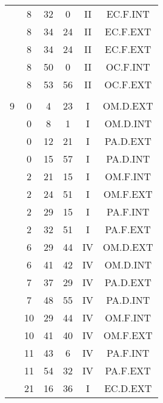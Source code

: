 \documentclass[12pt, a4paper]{article}
\begin{document}
\begin{multicols}{3}
{\begin{tabular}{c c c c c c}
	 	 	 	 & 8 & 32 & 0 & II & EC.F.INT\\%
	 	 	 	 & 8 & 34 & 24 & II & EC.F.EXT\\%
	 	 	 	 & 8 & 34 & 24 & II & EC.F.EXT\\%
	 	 	 	 & 8 & 50 & 0 & II & OC.F.INT\\%
	 	 	 	 & 8 & 53 & 56 & II & OC.F.EXT\\%
	 	 	 	 & & & & & \\%
	 	 	 	9 & 0 & 4 & 23 & I & OM.D.EXT\\%
	 	 	 	 & 0 & 8 & 1 & I & OM.D.INT\\%
	 	 	 	 & 0 & 12 & 21 & I & PA.D.EXT\\%
	 	 	 	 & 0 & 15 & 57 & I & PA.D.INT\\%
	 	 	 	 & 2 & 21 & 15 & I & OM.F.INT\\%
	 	 	 	 & 2 & 24 & 51 & I & OM.F.EXT\\%
	 	 	 	 & 2 & 29 & 15 & I & PA.F.INT\\%
	 	 	 	 & 2 & 32 & 51 & I & PA.F.EXT\\%
	 	 	 	 & 6 & 29 & 44 & IV & OM.D.EXT\\%
	 	 	 	 & 6 & 41 & 42 & IV & OM.D.INT\\%
	 	 	 	 & 7 & 37 & 29 & IV & PA.D.EXT\\%
	 	 	 	 & 7 & 48 & 55 & IV & PA.D.INT\\%
	 	 	 	 & 10 & 29 & 44 & IV & OM.F.INT\\%
	 	 	 	 & 10 & 41 & 40 & IV & OM.F.EXT\\%
	 	 	 	 & 11 & 43 & 6 & IV & PA.F.INT\\%
	 	 	 	 & 11 & 54 & 32 & IV & PA.F.EXT\\%
	 	 	 	 & 21 & 16 & 36 & I & EC.D.EXT\\%

\end{tabular}}
\end{multicols}
\end{document}
